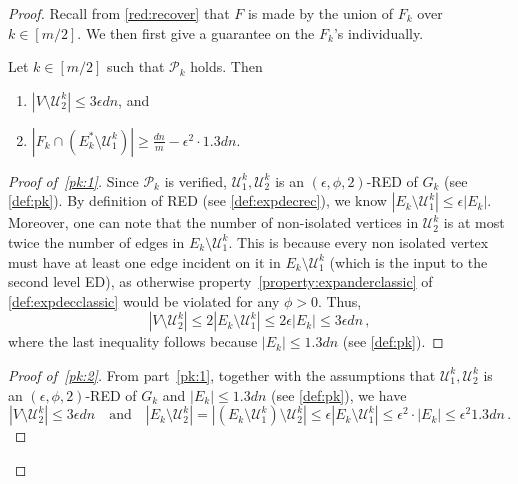 \begin{proof}
Recall from \cref{red:recover} that $F$ is made by the union of $F_k$ over 	$k \in [m/2]$. We then first give a guarantee on the $F_k$'s individually.
	\begin{claim}
		\label{claim:pkrecover}
		Let $k \in [m/2]$ such that $\mathcal{P}_k$ holds. Then
		\begin{enumerate}
			\item \label{pk:1} $|V \setminus \mathcal{U}_2^k| \le 3 \epsilon dn$, and
			\item \label{pk:2} $|F_k  \cap (E^*_k \setminus \mathcal{U}^k_1) | \ge \frac{dn}{m}-\epsilon^2 \cdot 1.3 dn$.
		\end{enumerate}
	\end{claim}
	\begin{proof}[Proof of~\eqref{pk:1}]
		Since $\mathcal{P}_k$ is verified, $\mathcal{U}_1^k,\mathcal{U}_2^k$ is an $(\epsilon,\phi,2)$-RED of  $G_k$ (see \cref{def:pk}). By definition of RED (see \cref{def:expdecrec}), we know $|E_k \setminus \mathcal{U}^k_1| \le \epsilon |E_k|$. Moreover, one can note that the number of non-isolated vertices in $ \mathcal{U}_2^k$ is at most twice the number of edges in $E_k \setminus  \mathcal{U}_1^k$. This is because every non isolated vertex must have at least one edge incident on it in $E_k \setminus  \mathcal{U}_1^k$ (which is the input to the second level ED), as otherwise property~\eqref{property:expanderclassic} of \cref{def:expdecclassic} would be violated for any $\phi > 0 $. Thus,
		\begin{equation*}
			|V \setminus \mathcal{U}_2^k| \le 2|E_k \setminus \mathcal{U}^k_1| \le 2\epsilon |E_k|  \le 3 \epsilon dn\, ,
		\end{equation*}
		where the last inequality follows because $|E_k|\le 1.3 dn$ (see \cref{def:pk}).
	\end{proof}
	\begin{proof}[Proof of~\eqref{pk:2}]
		From part~\eqref{pk:1}, together with the assumptions that $\mathcal{U}_1^k,\mathcal{U}_2^k$ is an $(\epsilon,\phi,2)$-RED of $G_k$ and $|E_k|\le 1.3 dn$ (see \cref{def:pk}), we have
		\begin{equation*}
			\left|V \setminus \mathcal{U}^k_2 \right|   \le 3\epsilon dn\quad \text{and} \quad \left|E_k \setminus \mathcal{U}_2^k \right| = \left|\left(E_k \setminus \mathcal{U}_1^k \right) \setminus \mathcal{U}_2^k\right| \le \epsilon \left|E_k \setminus \mathcal{U}_1^k \right| \le \epsilon^2 \cdot |E_k| \le \epsilon^2 1.3 dn\, .
		\end{equation*}

\end{proof}
\end{proof}
